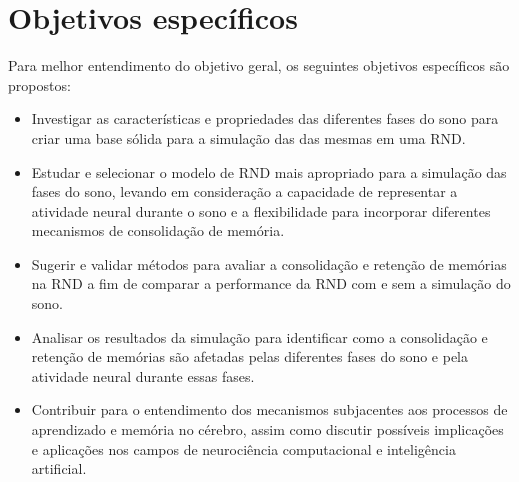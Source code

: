 \section{Objetivos específicos}

Para melhor entendimento do objetivo geral, os seguintes objetivos específicos são propostos:

\begin{itemize}

  \item Investigar as características e propriedades das diferentes fases do sono para criar uma base sólida para a simulação das
das mesmas em uma RND.\@

  \item Estudar e selecionar o modelo de RND mais apropriado para a simulação das fases do sono, levando em consideração a
capacidade de representar a atividade neural durante o sono e a flexibilidade para incorporar diferentes mecanismos de
consolidação de memória.

  \item Sugerir e validar métodos para avaliar a consolidação e retenção de memórias na RND a fim de comparar a performance da
  RND com e sem a simulação do sono.

  \item  Analisar os resultados da simulação para identificar como a consolidação e retenção de memórias são afetadas pelas
diferentes fases do sono e pela atividade neural durante essas fases.

  \item Contribuir para o entendimento dos mecanismos subjacentes aos processos de aprendizado e memória no cérebro, assim como
discutir possíveis implicações e aplicações nos campos de neurociência computacional e inteligência artificial.

\end{itemize}


